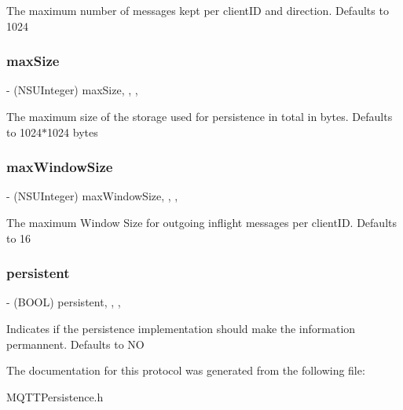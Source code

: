 The maximum number of messages kept per client\+ID and direction. Defaults to 1024 \mbox{\label{protocol_m_q_t_t_persistence-p_a9803a6b662157637e28949766186c3d5}} 
\subsubsection{\texorpdfstring{max\+Size}{maxSize}}
{\footnotesize\ttfamily -\/ (N\+S\+U\+Integer) max\+Size\hspace{0.3cm}{\ttfamily [read]}, {\ttfamily [write]}, {\ttfamily [nonatomic]}, {\ttfamily [assign]}}

The maximum size of the storage used for persistence in total in bytes. Defaults to 1024$\ast$1024 bytes \mbox{\label{protocol_m_q_t_t_persistence-p_a7566c5b7fff68c034ffd836c32d1b822}} 
\subsubsection{\texorpdfstring{max\+Window\+Size}{maxWindowSize}}
{\footnotesize\ttfamily -\/ (N\+S\+U\+Integer) max\+Window\+Size\hspace{0.3cm}{\ttfamily [read]}, {\ttfamily [write]}, {\ttfamily [nonatomic]}, {\ttfamily [assign]}}

The maximum Window Size for outgoing inflight messages per client\+ID. Defaults to 16 \mbox{\label{protocol_m_q_t_t_persistence-p_abe825bce839eb0d41e4b7428893ad8b8}} 
\subsubsection{\texorpdfstring{persistent}{persistent}}
{\footnotesize\ttfamily -\/ (B\+O\+OL) persistent\hspace{0.3cm}{\ttfamily [read]}, {\ttfamily [write]}, {\ttfamily [nonatomic]}, {\ttfamily [assign]}}

Indicates if the persistence implementation should make the information permannent. Defaults to NO 

The documentation for this protocol was generated from the following file\+:\begin{DoxyCompactItemize}
\item 
M\+Q\+T\+T\+Persistence.\+h\end{DoxyCompactItemize}
